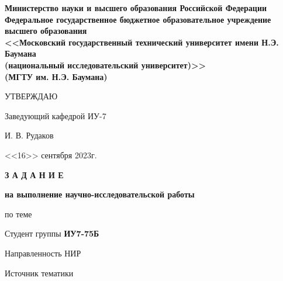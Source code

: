 \setlength\parindent{0pt}
\begin{center}
	\fontsize{12pt}{0.3\baselineskip}\selectfont \textbf{Министерство науки и высшего образования Российской Федерации \\ Федеральное государственное бюджетное образовательное учреждение \\ высшего образования \\ <<Московский государственный технический университет имени Н.Э. Баумана \\ (национальный исследовательский университет)>> \\ (МГТУ им. Н.Э. Баумана)}
\end{center}
\vspace*{-0.5cm}
\begin{center}
	\fontsize{12pt}{0.1\baselineskip}\selectfont
	\noindent\makebox[\linewidth]{\rule{\textwidth}{1pt}} \makebox[\linewidth]{\rule{\textwidth}{4pt}}
\end{center}

\begin{flushright}
	\fontsize{12pt}{0.4cm}\selectfont
	УТВЕРЖДАЮ\mbox{\hspace{2.5cm}}
	
	Заведующий кафедрой ИУ-7
	
	\uline{\mbox{\hspace{3cm}}} И. В. Рудаков
	
	<<16>> сентября 2023г.
\end{flushright}

\begin{center}
	\fontsize{20pt}{14pt}\selectfont

	\textbf{З А Д А Н И Е}
	
	\textbf{на выполнение научно-исследовательской работы}
\end{center}


\fontsize{12pt}{0.6cm}\selectfont	

по теме 
	
	
Студент группы \textbf{ИУ7-75Б}
	
	
Направленность НИР
	
	
Источник тематики
	
	
